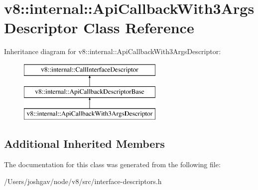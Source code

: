 \hypertarget{classv8_1_1internal_1_1_api_callback_with3_args_descriptor}{}\section{v8\+:\+:internal\+:\+:Api\+Callback\+With3\+Args\+Descriptor Class Reference}
\label{classv8_1_1internal_1_1_api_callback_with3_args_descriptor}
Inheritance diagram for v8\+:\+:internal\+:\+:Api\+Callback\+With3\+Args\+Descriptor\+:\begin{figure}[H]
\begin{center}
\leavevmode
\includegraphics[height=3.000000cm]{classv8_1_1internal_1_1_api_callback_with3_args_descriptor}
\end{center}
\end{figure}
\subsection*{Additional Inherited Members}


The documentation for this class was generated from the following file\+:\begin{DoxyCompactItemize}
\item 
/\+Users/joshgav/node/v8/src/interface-\/descriptors.\+h\end{DoxyCompactItemize}
